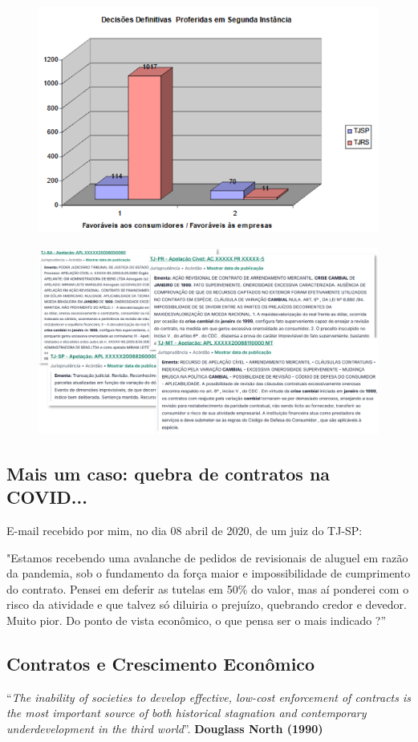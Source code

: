 \documentclass[a4paper,12pt]{article}[abntex2]
\begin{document}
\begin{figure}[H]
    \centering
    \includegraphics[width=0.5\linewidth]{Imagens/a10i5.png}
\end{figure}

\begin{figure}[H]
    \centering
    \includegraphics[width=0.7\linewidth]{Imagens/a10i6.png}
\end{figure}

\subsection{\textbf{Mais um caso: quebra de contratos na COVID... }}
E-mail recebido por mim, no dia 08 abril de 2020, de um juiz do TJ-SP:

"Estamos recebendo uma avalanche de pedidos de revisionais de aluguel em razão da pandemia, sob o fundamento da força maior e impossibilidade de cumprimento do contrato. Pensei em deferir as tutelas em 50\% do valor, mas aí ponderei com o risco da atividade e que talvez só diluiria o prejuízo, quebrando credor e devedor. Muito pior. Do ponto de vista econômico, o que pensa ser o mais indicado ?”

\subsection{\textbf{Contratos e Crescimento Econômico}}
“\textit{The inability of societies to develop effective, low-cost enforcement of contracts is the most important source of both historical stagnation and contemporary underdevelopment in the third world}”. \textbf{Douglass North (1990)}
\end{document}
